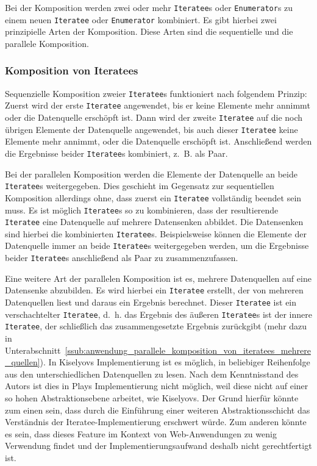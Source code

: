 Bei der Komposition werden zwei oder mehr \lstinline|Iteratee|s oder \lstinline|Enumerator|s zu einem neuen \lstinline|Iteratee| oder \lstinline|Enumerator| kombiniert.
Es gibt hierbei zwei prinzipielle Arten der Komposition.
Diese Arten sind die sequentielle und die parallele Komposition.

\subsubsection{Komposition von Iteratees} %
\label{ssub:komposition_von_iteratees}

Sequenzielle Komposition zweier \lstinline|Iteratee|s funktioniert nach folgendem Prinzip:
Zuerst wird der erste \lstinline|Iteratee| angewendet, bis er keine Elemente mehr annimmt oder die Datenquelle erschöpft ist.
Dann wird der zweite \lstinline|Iteratee| auf die noch übrigen Elemente der Datenquelle angewendet, bis auch dieser \lstinline|Iteratee| keine Elemente mehr annimmt, oder die Datenquelle erschöpft ist.
Anschließend werden die Ergebnisse beider \lstinline|Iteratee|s kombiniert, z.~B. als Paar. %

Bei der parallelen Komposition werden die Elemente der Datenquelle an beide \lstinline|Iteratee|s weitergegeben.
Dies geschieht im Gegensatz zur sequentiellen Komposition allerdings ohne, dass zuerst ein \lstinline|Iteratee| vollständig beendet sein muss.
Es ist möglich \lstinline|Iteratee|s so zu kombinieren, dass der resultierende \lstinline|Iteratee| eine Datenquelle auf mehrere Datensenken abbildet.
Die Datensenken sind hierbei die kombinierten \lstinline|Iteratee|s.
Beispielsweise können die Elemente der Datenquelle immer an beide \lstinline|Iteratee|s weitergegeben werden, um die Ergebnisse beider \lstinline|Iteratee|s anschließend als Paar zu zusammenzufassen. %

Eine weitere Art der parallelen Komposition ist es, mehrere Datenquellen auf eine Datensenke abzubilden.
Es wird hierbei ein \lstinline|Iteratee| erstellt, der von mehreren Datenquellen liest und daraus ein Ergebnis berechnet.
Dieser \lstinline|Iteratee| ist ein verschachtelter \lstinline|Iteratee|, d.~h. das Ergebnis des äußeren \lstinline|Iteratee|s ist der innere \lstinline|Iteratee|, der schließlich das zusammengesetzte Ergebnis zurückgibt (mehr dazu in Unterabschnitt~\ref{ssub:anwendung_parallele_komposition_von_iteratees_mehrere_quellen}).
In Kiselyovs Implementierung ist es möglich, in beliebiger Reihenfolge aus den unterschiedlichen Datenquellen zu lesen.
Nach dem Kenntnisstand des Autors ist dies in Plays Implementierung nicht möglich, weil diese nicht auf einer so hohen Abstraktionsebene arbeitet, wie Kiselyovs.
Der Grund hierfür könnte zum einen sein, dass durch die Einführung einer weiteren Abstraktionsschicht das Verständnis der Iteratee-Implementierung erschwert würde.
Zum anderen könnte es sein, dass dieses Feature im Kontext von Web-Anwendungen zu wenig Verwendung findet und der Implementierungsaufwand deshalb nicht gerechtfertigt ist.

